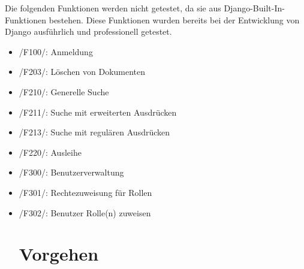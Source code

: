 Die folgenden Funktionen werden nicht getestet, da sie aus
Django-Built-In-Funktionen bestehen. Diese Funktionen wurden bereits bei der
Entwicklung von Django ausführlich und professionell getestet.

\begin{itemize}
\item /F100/: Anmeldung
\item /F203/: Löschen von Dokumenten
\item /F210/: Generelle Suche
\item /F211/: Suche mit erweiterten Ausdrücken
\item /F213/: Suche mit regulären Ausdrücken
\item /F220/: Ausleihe
\item /F300/: Benutzerverwaltung
\item /F301/: Rechtezuweisung für Rollen
\item /F302/: Benutzer Rolle(n) zuweisen

\section{Vorgehen}




\end{itemize}
